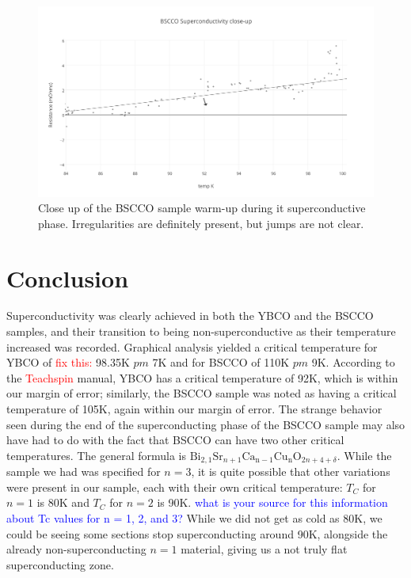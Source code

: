 \documentclass[prb,preprint]{revtex4-1}
\begin{document}
\begin{figure}[h!]
\centering
\includegraphics[width=7in]{bscco_superconductivity_close-up.png}
\caption{Close up of the BSCCO sample warm-up during it superconductive phase. Irregularities are definitely present, but jumps are not clear.}
\label{BSCCOplot2}
\end{figure}

\section{Conclusion}

Superconductivity was clearly achieved in both the YBCO and the BSCCO samples, and their transition to being non-superconductive as their temperature increased was recorded. Graphical analysis yielded a critical temperature for YBCO of \textcolor{red}{fix this:} 98.35K $pm$ 7K and for BSCCO of 110K $pm$ 9K. According to the \textcolor{red}{Teachspin} manual, YBCO has a critical temperature of 92K, which is within our margin of error; similarly, the BSCCO sample was noted as having a critical temperature of 105K, again within our margin of error. The strange behavior seen during the end of the superconducting phase of the BSCCO sample may also have had to do with the fact that BSCCO can have two other critical temperatures. The general formula is $\textrm{Bi}_{2,1}\textrm{Sr}_{n+1}\textrm{Ca}_{\textrm{n}-1}\textrm{Cu}_{\textrm{n}}\textrm{O}_{2n+4+\delta}$. While the sample we had was specified for $n=3$, it is quite possible that other variations were present in our sample, each with their own critical temperature: $T_C$ for $n=1$ is 80K and $T_C$ for $n=2$ is 90K. \textcolor{blue}{what is your source for this information about Tc values for n  = 1, 2, and 3?} While we did not get as cold as 80K, we could be seeing some sections stop superconducting around 90K, alongside the already non-superconducting $n=1$ material, giving us a not truly flat superconducting zone.
\end{document}
